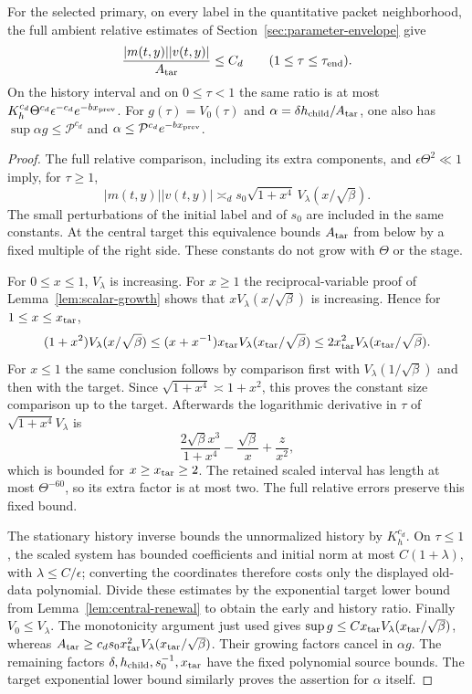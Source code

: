 \begin{lemma}\label{lem:uniform-packet-size}
For the selected primary, on every label in the quantitative packet
neighborhood, the full ambient relative estimates of
Section~\ref{sec:parameter-envelope} give
\[
 \frac{|m(t,y)||v(t,y)|}{A_{\rm tar}}\leq C_d
       \qquad(1\leq\tau\leq\tau_{\rm end}).
\]
On the history interval and on $0\leq\tau<1$ the same ratio is at most
$K_h^{c_d}\Theta^{c_d}\epsilon^{-c_d}e^{-b x_{\rm prev}}$.
For $g(\tau)=V_0(\tau)$ and
$\alpha=\delta h_{\rm child}/A_{\rm tar}$, one also has
$\sup\alpha g\leq\mathcal P^{c_d}$ and
$\alpha\leq\mathcal P^{c_d}e^{-b x_{\rm prev}}$.
\end{lemma}
\begin{proof}
The full relative comparison, including its extra components, and
$\epsilon\Theta^2\ll1$ imply, for $\tau\geq1$,
\[
 |m(t,y)||v(t,y)|\asymp_d
       s_0\sqrt{1+x^4}\,V_\lambda(x/\sqrt\beta).
\]
The small perturbations of the initial label and of $s_0$ are included
in the same constants. At the central target this equivalence bounds
$A_{\rm tar}$ from below by a fixed multiple of the right side.
These constants do not grow with $\Theta$ or the stage.

For $0\leq x\leq1$, $V_\lambda$ is increasing. For $x\geq1$ the
reciprocal-variable proof of Lemma~\ref{lem:scalar-growth} shows that
$xV_\lambda(x/\sqrt\beta)$ is increasing. Hence for
$1\leq x\leq x_{\rm tar}$,
\[
 (1+x^2)V_\lambda(x/\sqrt\beta)
 \leq (x+x^{-1})x_{\rm tar}
             V_\lambda(x_{\rm tar}/\sqrt\beta)
 \leq2x_{\rm tar}^2V_\lambda(x_{\rm tar}/\sqrt\beta).
\]
For $x\leq1$ the same conclusion follows by comparison first with
$V_\lambda(1/\sqrt\beta)$ and then with the target. Since
$\sqrt{1+x^4}\asymp1+x^2$, this proves the constant size comparison
up to the target. Afterwards the logarithmic derivative in $\tau$ of
$\sqrt{1+x^4}V_\lambda$ is
\[
 \frac{2\sqrt\beta x^3}{1+x^4}-\frac{\sqrt\beta}{x}
                                          +\frac z{x^2},
\]
which is bounded for $x\geq x_{\rm tar}\geq2$. The retained scaled
interval has length at most $\Theta^{-60}$, so its extra factor is at
most two. The full relative errors preserve this fixed bound.

The stationary history inverse bounds the unnormalized history by
$K_h^{c_d}$. On $\tau\leq1$, the scaled system has bounded
coefficients and initial norm at most $C(1+\lambda)$, with
$\lambda\leq C/\epsilon$; converting the coordinates therefore costs
only the displayed old-data polynomial. Divide these estimates by
the exponential target lower bound from
Lemma~\ref{lem:central-renewal} to obtain the early and history ratio.
Finally $V_0\leq V_\lambda$. The monotonicity argument just used gives
$\sup g\leq C x_{\rm tar}V_\lambda(x_{\rm tar}/\sqrt\beta)$,
whereas
$A_{\rm tar}\geq c_d s_0x_{\rm tar}^2
V_\lambda(x_{\rm tar}/\sqrt\beta)$.
Their growing factors cancel in $\alpha g$. The remaining factors
$\delta,h_{\rm child},s_0^{-1},x_{\rm tar}$ have the fixed polynomial
source bounds. The target exponential lower bound similarly proves
the assertion for $\alpha$ itself.
\end{proof}
